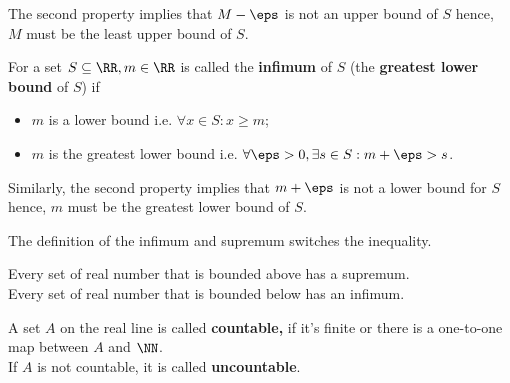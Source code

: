 \documentclass[12pt, a4paper]{article}
\begin{document}
\begin{mdnote}
    The second property implies that \(M-\eps\) is not an upper bound of \(S\) hence, \(M\) must be the least upper bound of \(S\).
\end{mdnote}

\begin{definition}
    For a set \(S \subseteq \RR, m \in \RR\) is called the \textbf{infimum} of \(S\) (the \textbf{greatest lower bound} of \(S\)) if 
    \begin{itemize}
        \item \(m\) is a lower bound i.e. \(\forall x \in S: x\geq m\);
        \item \(m\) is the greatest lower bound i.e. \(\forall \eps>0, \exists s\in S : m+\eps >s\).
    \end{itemize}
\end{definition}

\begin{mdnote}
    Similarly, the second property implies that \(m+\eps\) is not a lower bound for \(S\) hence, \(m\) must be the greatest lower bound of \(S\).
\end{mdnote}

\begin{mdremark}
    The definition of the infimum and supremum switches the inequality.
\end{mdremark}



\begin{mdthm}
Every set of real number that is bounded above has a supremum. \\
Every set of real number that is bounded below has an infimum.
\end{mdthm}

\begin{definition}
    A set \(A\) on the real line is called \textbf{countable,} if it's finite or there is a one-to-one map between \(A\) and \(\NN\). \\
    If \(A\) is not countable, it is called \textbf{uncountable}.
\end{definition}
\end{document}
